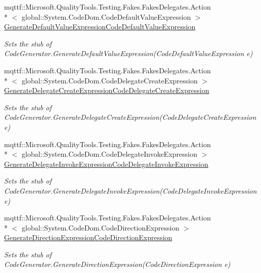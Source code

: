 \begin{DoxyCompactItemize}
mqttf\-::\-Microsoft.\-Quality\-Tools.\-Testing.\-Fakes.\-Fakes\-Delegates.\-Action\\*
$<$ global\-::\-System.\-Code\-Dom.\-Code\-Default\-Value\-Expression $>$ \hyperlink{class_system_1_1_code_dom_1_1_compiler_1_1_fakes_1_1_stub_code_generator_a55a86548be10ff1e047b5e4641ef0489}{Generate\-Default\-Value\-Expression\-Code\-Default\-Value\-Expression}
\begin{DoxyCompactList}\small\item\em Sets the stub of Code\-Generator.\-Generate\-Default\-Value\-Expression(\-Code\-Default\-Value\-Expression e)\end{DoxyCompactList}\item 
mqttf\-::\-Microsoft.\-Quality\-Tools.\-Testing.\-Fakes.\-Fakes\-Delegates.\-Action\\*
$<$ global\-::\-System.\-Code\-Dom.\-Code\-Delegate\-Create\-Expression $>$ \hyperlink{class_system_1_1_code_dom_1_1_compiler_1_1_fakes_1_1_stub_code_generator_a57f1a4dc36f715ebf696dcc033606f74}{Generate\-Delegate\-Create\-Expression\-Code\-Delegate\-Create\-Expression}
\begin{DoxyCompactList}\small\item\em Sets the stub of Code\-Generator.\-Generate\-Delegate\-Create\-Expression(\-Code\-Delegate\-Create\-Expression e)\end{DoxyCompactList}\item 
mqttf\-::\-Microsoft.\-Quality\-Tools.\-Testing.\-Fakes.\-Fakes\-Delegates.\-Action\\*
$<$ global\-::\-System.\-Code\-Dom.\-Code\-Delegate\-Invoke\-Expression $>$ \hyperlink{class_system_1_1_code_dom_1_1_compiler_1_1_fakes_1_1_stub_code_generator_a5c1e1392da65f6584b0e13d5377a44ea}{Generate\-Delegate\-Invoke\-Expression\-Code\-Delegate\-Invoke\-Expression}
\begin{DoxyCompactList}\small\item\em Sets the stub of Code\-Generator.\-Generate\-Delegate\-Invoke\-Expression(\-Code\-Delegate\-Invoke\-Expression e)\end{DoxyCompactList}\item 
mqttf\-::\-Microsoft.\-Quality\-Tools.\-Testing.\-Fakes.\-Fakes\-Delegates.\-Action\\*
$<$ global\-::\-System.\-Code\-Dom.\-Code\-Direction\-Expression $>$ \hyperlink{class_system_1_1_code_dom_1_1_compiler_1_1_fakes_1_1_stub_code_generator_a65a59d49c32c51137ccf2516397ff3c0}{Generate\-Direction\-Expression\-Code\-Direction\-Expression}
\begin{DoxyCompactList}\small\item\em Sets the stub of Code\-Generator.\-Generate\-Direction\-Expression(\-Code\-Direction\-Expression e)\end{DoxyCompactList}\item 

\end{DoxyCompactItemize}
